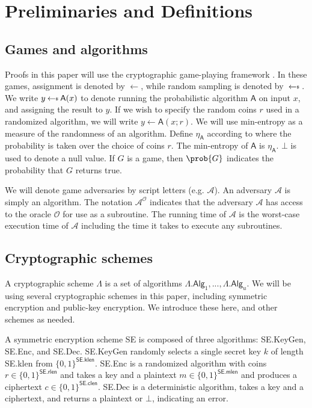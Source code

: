 \chapter{Preliminaries and Definitions} \label{sec:preliminaries}

\section{Games and algorithms}
Proofs in this paper will use the cryptographic game-playing framework \cite{EC:BelRog06}. In these games, assignment is denoted by $\leftarrow$, while random sampling is denoted by $\sample$. We write $y \sample \mathsf{A}(x)$ to denote running the probabilistic algorithm $\mathsf{A}$ on input $x$, and assigning the result to $y$. If we wish to specify the random coins $r$ used in a randomized algorithm, we will write $y \leftarrow \mathsf{A}(x;r)$. We will use min-entropy as a measure of the randomness of an algorithm. Define $\eta_\mathsf{A}$ according to
where the probability is taken over the choice of coins $r$. The min-entropy of $\mathsf{A}$ is $\eta_\mathsf{A}$. $\bot$ is used to denote a null value. If $G$ is a game, then $\prob{G}$ indicates the probability that $G$ returns true.

We will denote game adversaries by script letters (e.g. $\mathcal{A}$). An adversary $\mathcal{A}$ is simply an algorithm. The notation $\mathcal{A}^{\mathcal{O}}$ indicates that the adversary $\mathcal{A}$ has access to the oracle $\mathcal{O}$ for use as a subroutine. The running time of $\mathcal{A}$ is the worst-case execution time of $\mathcal{A}$ including the time it takes to execute any subroutines.


\section{Cryptographic schemes}
A cryptographic scheme $\mathsf{\Lambda}$ is a set of algorithms $\mathsf{\Lambda.Alg}_1,..., \mathsf{\Lambda.Alg}_u$. We will be using several cryptographic schemes in this paper, including symmetric encryption and public-key encryption. We introduce these here, and other schemes as needed.

A symmetric encryption scheme \textsf{SE} is composed of three algorithms: \textsf{SE.KeyGen}, \textsf{SE.Enc}, and \textsf{SE.Dec}. \textsf{SE.KeyGen} randomly selects a single secret key $k$ of length \textsf{SE.klen} from $\{0,1\}^\mathsf{SE.klen}$. \textsf{SE.Enc} is a randomized algorithm with coins $r\in \{0,1\}^\mathsf{SE.rlen}$ and takes a key and a plaintext $m\in \{0,1\}^\mathsf{SE.mlen}$ and produces a ciphertext $c\in \{0,1\}^\mathsf{SE.clen}$. \textsf{SE.Dec} is a deterministic algorithm, takes a key and a ciphertext, and returns a plaintext or $\bot$, indicating an error.

